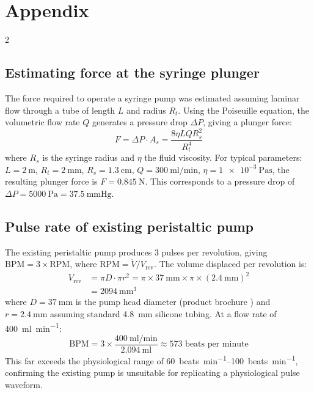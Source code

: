 \documentclass[10pt, a4paper]{article}
\begin{document}
\section{Appendix}
\begin{multicols}{2}

    \subsection{Estimating force at the syringe plunger}
    The force required to operate a syringe pump was estimated assuming laminar flow through a tube of length $L$ and radius $R_t$. Using the Poiseuille equation, the volumetric flow rate $Q$ generates a pressure drop $\Delta P$, giving a plunger force:
    \begin{equation*}
        F = \Delta P \cdot A_s = \frac{8 \eta L Q R_s^2}{R_t^4}
    \end{equation*}
    where $R_s$ is the syringe radius and $\eta$ the fluid viscosity. For typical parameters: $L = \SI{2}{\metre}$, $R_t = \SI{2}{\milli\metre}$, $R_s = \SI{1.3}{\centi\metre}$, $Q = \SI{300}{\milli\litre\per\minute}$, $\eta = \SI{1e-3}{\pascal\second}$, the resulting plunger force is $F = \SI{0.845}{\newton}$. This corresponds to a pressure drop of $\Delta P = \SI{5000}{\pascal} = \SI{37.5}{\mmHg}$.

    \subsection{Pulse rate of existing peristaltic pump}

    The existing peristaltic pump produces 3 pulses per revolution, giving $\text{BPM} = 3 \times \text{RPM}$, where $\text{RPM} = \dot{V} / V_\text{rev}$. The volume displaced per revolution is:
    \begin{align*}
        V_\text{rev} & = \pi D \cdot \pi r^2 = \pi \times \qty{37}{\milli\metre} \times \pi \times (\qty{2.4}{\milli\metre})^2 \\
                     & = \qty{2094}{\milli\metre\cubed}
    \end{align*}
    where $D = \qty{37}{\milli\metre}$ is the pump head diameter (product brochure \cite{KamoerKK1800Peristaltic}) and $r = \qty{2.4}{\milli\metre}$ assuming standard \qty{4.8}{\milli\metre} silicone tubing. At a flow rate of \qty{400}{\milli\litre\per\minute}:
    \begin{equation}
        \text{BPM} = 3 \times \frac{\qty{400}{\milli\litre\per\minute}}{\qty{2.094}{\milli\litre}} \approx 573 \text{ beats per minute}
    \end{equation}
    This far exceeds the physiological range of \qtyrange{60}{100}{beats\per\minute}, confirming the existing pump is unsuitable for replicating a physiological pulse waveform.


\end{multicols}
\end{document}
